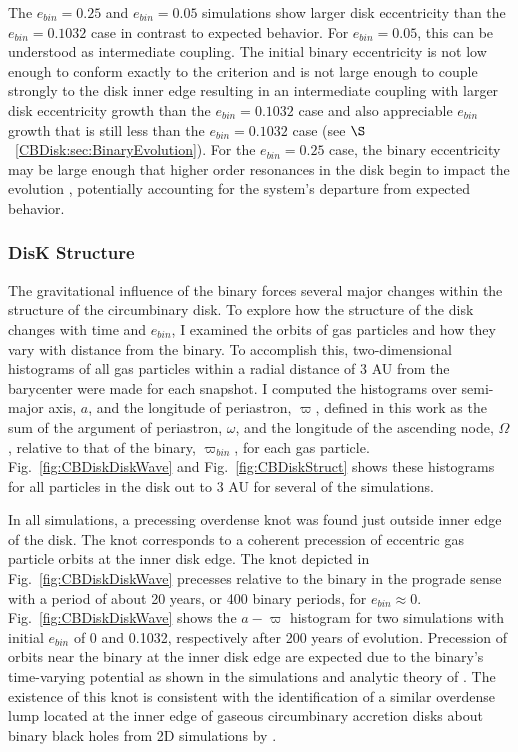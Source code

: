 The $e_{bin} = 0.25$ and $e_{bin} = 0.05$ simulations show larger disk eccentricity than
the $e_{bin} = 0.1032$ case in contrast to expected behavior.  For
$e_{bin} = 0.05$, this can be understood as intermediate coupling.
The initial binary eccentricity is not low enough to conform exactly
to the \citet{Papaloizou2001} criterion and is not large enough to
couple strongly to the disk inner edge resulting in an intermediate
coupling with larger disk eccentricity growth than the $e_{bin} = 0.1032$ case and also
appreciable $e_{bin}$ growth that is still less than the $e_{bin} = 0.1032$ case (see $\S$~\ref{CBDisk:sec:BinaryEvolution}).  For
the $e_{bin} = 0.25$ case, the binary eccentricity may be large enough that higher order resonances in the disk begin to impact the evolution \citep{Artymowicz1992}, potentially accounting for the system's departure from expected behavior.


\subsubsection{DisK Structure} \label{CBDisk:sec:discStructEvolution}

The gravitational influence of the binary forces several major changes within the structure of the circumbinary disk.  To explore how the
structure of the disk changes with time and $e_{bin}$, I examined the orbits of gas
particles and how they vary with distance from the binary.  To
accomplish this, two-dimensional histograms of all gas particles
within a radial distance of 3 AU from the barycenter were made for
each snapshot.  I computed the histograms over semi-major
axis, $a$, and the longitude of periastron, $\varpi$, defined in this
work as the sum of the argument of periastron, $\omega$, and the
longitude of the ascending node, $\Omega$, relative to that of the binary, $\varpi_{bin}$, for each gas particle. 
Fig.~\ref{fig:CBDiskDiskWave} and Fig.~\ref{fig:CBDiskStruct} shows these histograms
for all particles in the disk out to 3 AU
for several of the simulations.

In all simulations, a precessing overdense knot was found just outside
inner edge of the disk.  The knot corresponds to a coherent precession
of eccentric gas particle orbits at the inner disk edge.  The knot
depicted in Fig.~\ref{fig:CBDiskDiskWave} precesses relative to the binary
in the prograde sense with a period of about 20 years, or 400 binary
periods, for $e_{bin} \approx 0$.
Fig.~\ref{fig:CBDiskDiskWave} shows the $a - \varpi$ histogram 
for two simulations with initial $e_{bin}$ of 0 and 0.1032,
respectively after 200 years of evolution.
Precession of orbits near the binary at the inner disk edge are expected due to the binary's time-varying potential as shown in the simulations and analytic theory of \citet{Artymowicz2000}. The existence of this knot is consistent with the identification of a similar overdense lump located at the inner edge of 
gaseous circumbinary accretion disks about binary black holes from 2D simulations by \citet{Farris2014}.

